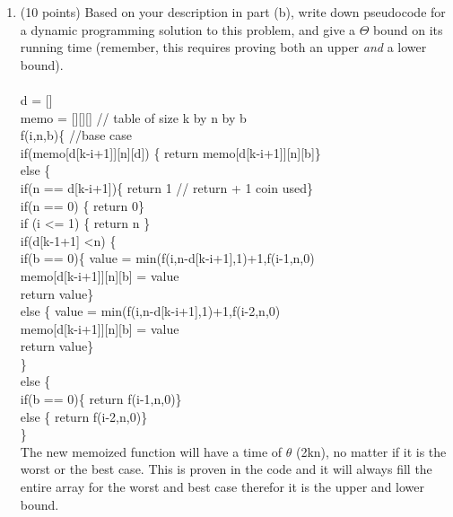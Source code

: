 \documentclass[12pt]{article}
\newcommand\tab[1][1cm]{\hspace*{#1}}
\begin{document}
\begin{enumerate}
\begin{enumerate}
\item \label{3c} (10 points) Based on your description in part (b), write down pseudocode for a
    dynamic programming solution to this problem, and give a $\Theta$ bound on
    its running time (remember, this requires proving both an upper
    \emph{and} a lower bound).\\\\
    d = []\\
    memo = [][][] // table of size k by n by b\\
    f(i,n,b)\{ 
    \tab //base case\\
    \tab if(memo[d[k-i+1]][n][d]) \{ return memo[d[k-i+1]][n][b]\}\\
    \tab else \{ \\
    \tab \tab if(n == d[k-i+1])\{ return 1 // return + 1 coin used\} \\
    \tab \tab if(n == 0) \{ return 0\} \\
	\tab \tab if (i \textless= 1) \{ return n \} \\
	\tab \tab if(d[k-1+1] \textless n) \{ \\
	\tab \tab \tab if(b == 0)\{ value = min(f(i,n-d[k-i+1],1)+1,f(i-1,n,0)\\
	\tab \tab \tab \tab memo[d[k-i+1]][n][b] = value\\
	\tab \tab \tab \tab return value\} \\
	\tab \tab \tab else \{ value = min(f(i,n-d[k-i+1],1)+1,f(i-2,n,0)\\
	\tab \tab \tab \tab memo[d[k-i+1]][n][b] = value\\
	\tab \tab \tab \tab return value\} \\
	\tab \tab \} \\
	\tab \tab else \{ \\
	\tab \tab \tab if(b == 0)\{ return f(i-1,n,0)\} \\
	\tab \tab \tab else \{ return  f(i-2,n,0)\} \\
	\tab \tab \} \\
	
	The new memoized function will have a time of $\theta$ (2{k}n), no matter if it is the worst or the best case. This is proven in the code and it will always fill the entire array for the worst and best case therefor it is the upper and lower bound.

\pagebreak
\end{enumerate}
	
	

\end{enumerate}
\end{document}
